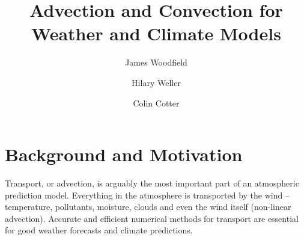 



\title{Advection and Convection for Weather and Climate Models}

\author[1]{James Woodfield}

\author[2]{Hilary Weller}

\author[3]{Colin Cotter}

\maketitle

\section{Background and Motivation}

Transport, or advection, is arguably the most important part of an atmospheric prediction model. Everything in the atmosphere is transported by the wind -- temperature, pollutants, moisture, clouds and even the wind itself (non-linear advection). Accurate and efficient numerical methods for transport are essential for good weather forecasts and climate predictions.


